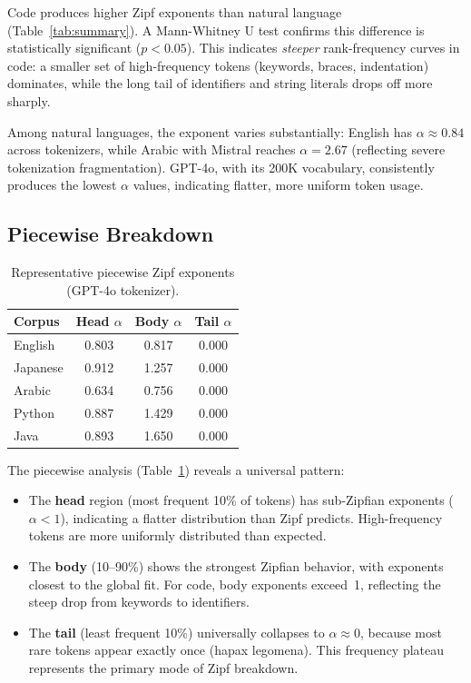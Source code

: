 \documentclass[11pt]{article}
\begin{document}
Code produces higher Zipf exponents than natural language (Table~\ref{tab:summary}).
A Mann-Whitney U test confirms this difference is statistically significant ($p < 0.05$).
This indicates \emph{steeper} rank-frequency curves in code: a smaller set of high-frequency tokens (keywords, braces, indentation) dominates, while the long tail of identifiers and string literals drops off more sharply.

Among natural languages, the exponent varies substantially: English has $\alpha \approx 0.84$ across tokenizers, while Arabic with Mistral reaches $\alpha = 2.67$ (reflecting severe tokenization fragmentation).
GPT-4o, with its 200K vocabulary, consistently produces the lowest $\alpha$ values, indicating flatter, more uniform token usage.

\subsection{Piecewise Breakdown}

\begin{table}[h]
\centering
\caption{Representative piecewise Zipf exponents (GPT-4o tokenizer).}
\label{tab:piecewise}
\begin{tabular}{lccc}
\toprule
Corpus & Head $\alpha$ & Body $\alpha$ & Tail $\alpha$ \\
\midrule
English   & 0.803 & 0.817 & 0.000 \\
Japanese  & 0.912 & 1.257 & 0.000 \\
Arabic    & 0.634 & 0.756 & 0.000 \\
Python    & 0.887 & 1.429 & 0.000 \\
Java      & 0.893 & 1.650 & 0.000 \\
\bottomrule
\end{tabular}
\end{table}

The piecewise analysis (Table~\ref{tab:piecewise}) reveals a universal pattern:
\begin{itemize}
  \item The \textbf{head} region (most frequent 10\% of tokens) has sub-Zipfian exponents ($\alpha < 1$), indicating a flatter distribution than Zipf predicts.
  High-frequency tokens are more uniformly distributed than expected.
  \item The \textbf{body} (10--90\%) shows the strongest Zipfian behavior, with exponents closest to the global fit.
  For code, body exponents exceed~1, reflecting the steep drop from keywords to identifiers.
  \item The \textbf{tail} (least frequent 10\%) universally collapses to $\alpha \approx 0$, because most rare tokens appear exactly once (hapax legomena).
  This frequency plateau represents the primary mode of Zipf breakdown.
\end{itemize}
\end{document}
